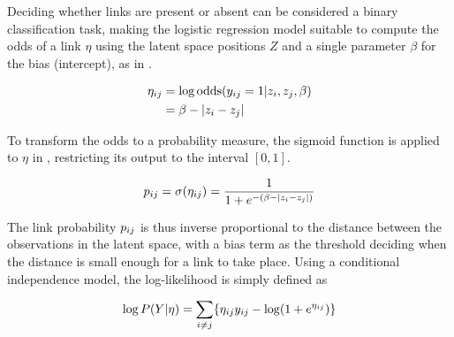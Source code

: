         Deciding whether links are present or absent can be considered a binary classification task, making the logistic regression model suitable to compute the odds of a link $\eta$ using the latent space positions $Z$ and a single parameter $\beta$ for the bias (intercept), as in .
        
        \begin{equation}\label{eq:link-odds}
            \begin{split}
                \sub(\eta) &= \log \odds(\sub(y)=1|z_i,z_j,\beta) \\
                           &= \beta - |z_i-z_j|
            \end{split}
        \end{equation}
        
        To transform the odds to a probability measure, the sigmoid function is applied to $\eta$ in , restricting its output to the interval $[0,1]$.
        
        \begin{equation}\label{eq:link-sigmoid}
            \sub(p) = \sigma(\sub(\eta)) = \frac{1}{1 + e^{-(\beta - |z_i-z_j|)}}
        \end{equation}
        
        The link probability $\sub(p)$ is thus inverse proportional to the distance between the observations in the latent space, with a bias term as the threshold deciding when the distance is small enough for a link to take place. Using a conditional independence model, the log-likelihood is simply defined as
        
        \begin{equation}
            \log P(Y|\eta) = \sum_{i\neq j}\{ \sub(\eta)\sub(y) - \log(1+e^{\sub(\eta)}) \}
        \end{equation}
        
        
        
        
